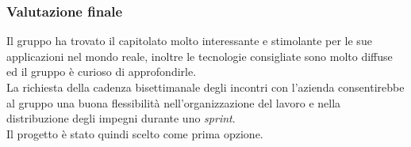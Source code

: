 \subsubsection{Valutazione finale}
Il gruppo ha trovato il capitolato molto interessante e stimolante per le sue applicazioni nel mondo reale, inoltre le tecnologie consigliate sono molto diffuse ed il gruppo è curioso di approfondirle.\\
La richiesta della cadenza bisettimanale degli incontri con l'azienda consentirebbe al gruppo una buona flessibilità nell'organizzazione del lavoro e nella distribuzione degli impegni durante uno \textit{sprint}.\\ 
Il progetto è stato quindi scelto come prima opzione.